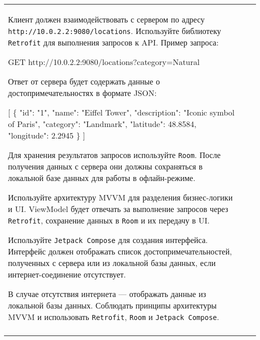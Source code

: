\documentclass[a4paper]{article}
\begin{document}
\begin{tabular}{!{\vrule width 2pt}p{5cm}|p{6cm}|p{4cm}!{\vrule width 2pt}}
{\begin{minipage}{16cm}
\begin{enumerate}
Клиент должен взаимодействовать с сервером по адресу \texttt{http://10.0.2.2:9080/locations}. Используйте библиотеку \texttt{Retrofit} для выполнения запросов к API. Пример запроса:


GET http://10.0.2.2:9080/locations?category=Natural


Ответ от сервера будет содержать данные о достопримечательностях в формате JSON:


[
  \{
    "id": "1",
    "name": "Eiffel Tower",
    "description": "Iconic symbol of Paris",
    "category": "Landmark",
    "latitude": 48.8584,
    "longitude": 2.2945
  \}
]


Для хранения результатов запросов используйте \texttt{Room}. После получения данных с сервера они должны сохраняться в локальной базе данных для работы в офлайн-режиме.

Используйте архитектуру MVVM для разделения бизнес-логики и UI. ViewModel будет отвечать за выполнение запросов через \texttt{Retrofit}, сохранение данных в \texttt{Room} и их передачу в UI.

Используйте \texttt{Jetpack Compose} для создания интерфейса. Интерфейс должен отображать список достопримечательностей, полученных с сервера или из локальной базы данных, если интернет-соединение отсутствует.

В случае отсутствия интернета — отображать данные из локальной базы данных.
Соблюдать принципы архитектуры MVVM и использовать \texttt{Retrofit}, \texttt{Room} и \texttt{Jetpack Compose}. 
\end{enumerate}

\vspace{0.2cm}
    
\end{minipage}
}
\\
\end{tabular}
\end{document}
